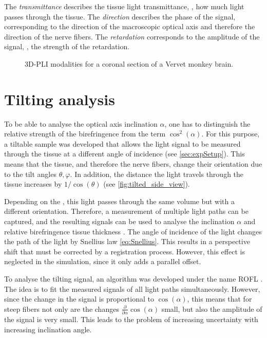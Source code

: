 %
The \textit{transmittance} describes the tissue light transmittance, \ie{}, how much light passes through the tissue.
The \textit{direction} describes the phase of the signal, corresponding to the direction of the macroscopic optical axis and therefore the direction of the nerve fibers.
The \textit{retardation} corresponds to the amplitude of the signal, \ie{}, the strength of the retardation.
%
\begin{figure}[t]

\caption[3D-PLI modalities]{3D-PLI modalities for a coronal section of a Vervet monkey brain.}
\end{figure}
%
%
\section{Tilting analysis} \label{sec::InclAnalysis}
%
To be able to analyse the optical axis inclination $\alpha$, one has to distinguish the relative strength of the birefringence from the term $\cos^2(\alpha)$.
For this purpose, a tiltable sample was developed that allows the light signal to be measured through the tissue at a different angle of incidence \cite{Axer2011, Wiese:887678} (see \cref{sec:expSetup}).
This means that the tissue, and therefore the nerve fibers, change their orientation due to the tilt angles $\theta, \varphi$.
In addition, the distance the light travels through the tissue increases by $1/\cos(\theta)$ (see \cref{fig:tilted_side_view}).
\par
%
Depending on the \Pixelsize{}, this light passes through the same volume but with a different orientation.
Therefore, a measurement of multiple light paths can be captured, and the resulting signals can be used to analyse the inclination $\alpha$ and relative birefringence tissue thickness \trel{}.
The angle of incidence of the light changes the path of the light by Snellius law \cref{eq:Snellius}.
This results in a perspective shift that must be corrected by a registration process.
However, this effect is neglected in the simulation, since it only adds a parallel offset.
\par
%
To analyse the tilting signal, an algorithm was developed under the name \ac{ROFL} \cite{Wiese:887678,Schmitz2018}.
The idea is to fit the measured signals of all light paths simultaneously.
However, since the change in the signal is proportional to $\cos(\alpha)$, this means that for steep fibers not only are the changes $\frac{\partial}{\partial \alpha} \cos(\alpha)$ small, but also the amplitude of the signal is very small.
This leads to the problem of increasing uncertainty with increasing inclination angle.
